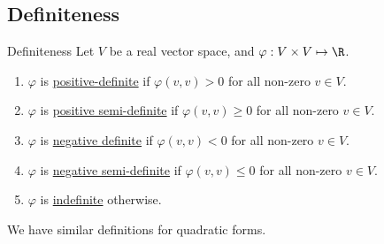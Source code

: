 \documentclass[../Main.tex]{subfiles}
\begin{document}
\subsection{Definiteness}
\begin{definition}{Definiteness}
    Let $V$ be a real vector space, and $\varphi : V \times V \mapsto \R$.
    \begin{enumerate}
        \item $\varphi$ is \underline{positive-definite} if $\varphi(v, v) > 0$ for all non-zero $v \in V$.
        \item $\varphi$ is \underline{positive semi-definite} if $\varphi(v, v) \geq 0$ for all non-zero $v \in V$.
        \item $\varphi$ is \underline{negative definite} if $\varphi(v, v) < 0$ for all non-zero $v \in V$.
        \item $\varphi$ is \underline{negative semi-definite} if $\varphi(v, v) \leq 0$ for all non-zero $v \in V$.
        \item $\varphi$ is \underline{indefinite} otherwise.
    \end{enumerate}
\end{definition}
We have similar definitions for quadratic forms.
\end{document}
